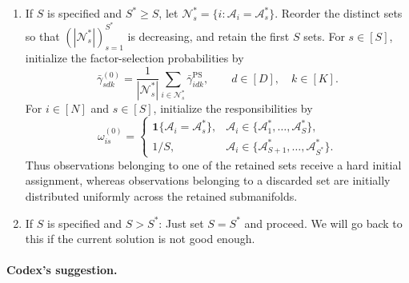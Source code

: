 \documentclass[11pt]{article}
\newcommand{\one}{\mathbf{1}}
\theoremstyle{plain}
\theoremstyle{definition}
\begin{document}
\begin{enumerate}
\item If $S$ is specified and $S^* \geq S$, let
$\mathcal N^*_s=\{i:\mathcal A_i=\mathcal A^*_{s}\}$. Reorder the distinct
sets so that $(|\mathcal N^*_s|)_{s=1}^{S^*}$ is decreasing, and retain the
first $S$ sets. For $s\in[S]$, initialize the factor-selection probabilities by
\begin{equation}
  \bar\gamma_{sdk}^{(0)}
  =
  \frac{1}{|\mathcal N_s^*|}
  \sum_{i\in\mathcal N_s^*}\bar\gamma_{idk}^{\mathrm{PS}},
  \qquad d\in[D],\quad k\in[K].
  \label{eq:pip-set-gamma-init}
\end{equation}
For $i\in[N]$ and $s\in[S]$, initialize the responsibilities by
\begin{equation}
  \omega_{is}^{(0)}
  =
  \begin{cases}
    \one\{\mathcal A_i=\mathcal A_s^*\},
      & \mathcal A_i\in\{\mathcal A_1^*,\ldots,\mathcal A_S^*\},\\[3pt]
    1/S,
      & \mathcal A_i\in
        \{\mathcal A_{S+1}^*,\ldots,\mathcal A_{S^*}^*\}.
  \end{cases}
  \label{eq:pip-set-omega-init}
\end{equation}
Thus observations belonging to one of the retained sets receive a hard initial
assignment, whereas observations belonging to a discarded set are initially
distributed uniformly across the retained submanifolds.
\item If $S$ is specified and $S > S^*$: Just set $S = S^*$ and proceed. We will go back to this if the current solution is not good enough.
\end{enumerate}




\paragraph{Codex's suggestion.}
\end{document}
